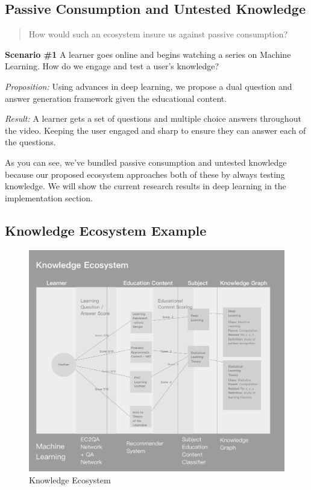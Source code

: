 \documentclass{acm_proc_article-sp}
\begin{document}
\subsection{Passive Consumption and Untested
Knowledge}\label{passive-consumption-and-untested-knowledge}

\begin{quote}
How would such an ecosystem insure us against passive consumption?
\end{quote}

\textbf{Scenario \#1} A learner goes online and begins watching a series
on Machine Learning. How do we engage and test a user's knowledge?

\emph{Proposition:} Using advances in deep learning, we propose a dual
question and answer generation framework given the educational content.

\emph{Result:} A learner gets a set of questions and multiple choice
answers throughout the video. Keeping the user engaged and sharp to
ensure they can answer each of the questions.

As you can see, we've bundled passive consumption and untested knowledge
because our proposed ecosystem approaches both of these by always
testing knowledge. We will show the current research results in deep
learning in the implementation section.

\subsection{Knowledge Ecosystem
Example}\label{knowledge-ecosystem-example}

\begin{figure}
\centering
\includegraphics{img/knowledgeEcosystem.png}
\caption{Knowledge Ecosystem}
\end{figure}
\end{document}
